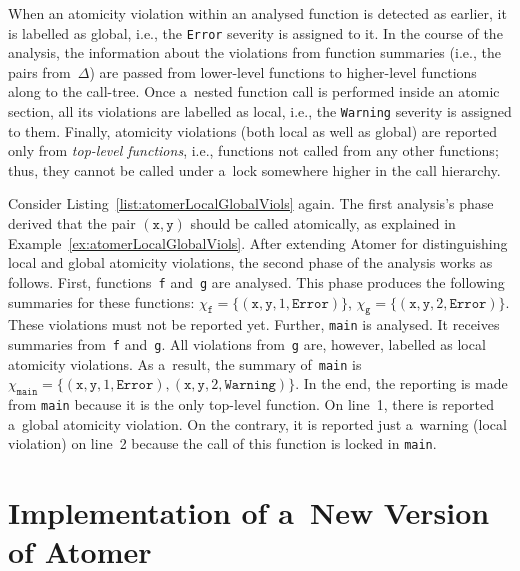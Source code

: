 When an atomicity violation within an analysed function is detected as earlier, it is labelled as global, i.e., the \texttt{Error} severity is assigned to it. In the course of the analysis, the information about the violations from function summaries (i.e., the pairs from~$ \Delta $) are passed from lower-level functions to higher-level functions along to the call-tree. Once a~nested function call is performed inside an atomic section, all its violations are labelled as local, i.e., the \texttt{Warning} severity is assigned to them. Finally, atomicity violations (both local as well as global) are reported only from \emph{top-level functions}, i.e., functions not called from any other functions; thus, they cannot be called under a~lock somewhere higher in the call hierarchy.

\begin{example}
    Consider Listing~\ref{list:atomerLocalGlobalViols} again. The first analysis's phase derived that the pair $ (\mathtt{x}, \mathtt{y}) $ should be called atomically, as explained in Example~\ref{ex:atomerLocalGlobalViols}. After extending Atomer for distinguishing local and global atomicity violations, the second phase of the analysis works as follows. First, functions~\texttt{f} and~\texttt{g} are analysed. This phase produces the following summaries for these functions: $ \chi_\mathtt{f} = \{(\mathtt{x}, \mathtt{y}, 1, \mathtt{Error})\} $, $ \chi_\mathtt{g} = \{(\mathtt{x}, \mathtt{y}, 2, \mathtt{Error})\} $. These violations must not be reported yet. Further, \texttt{main} is analysed. It receives summaries from~\texttt{f} and~\texttt{g}. All violations from~\texttt{g} are, however, labelled as local atomicity violations. As a~result, the summary of~\texttt{main} is $ \chi_\mathtt{main} = \{(\mathtt{x}, \mathtt{y}, 1, \mathtt{Error}), (\mathtt{x}, \mathtt{y}, 2, \mathtt{Warning})\} $. In the end, the reporting is made from \texttt{main} because it is the only top-level function. On line~1, there is reported a~global atomicity violation. On the contrary, it is reported just a~warning (local violation) on line~2 because the call of this function is locked in \texttt{main}.
\end{example}






\chapter{Implementation of a~New Version of Atomer}
\label{chap:implement}

